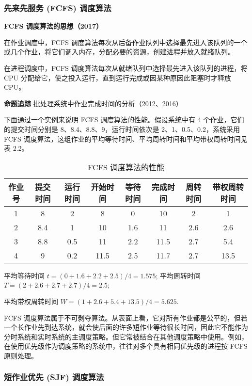 \documentclass{ctexbook}
\begin{document}
	\subsubsection{先来先服务 (FCFS) 调度算法}
	
	\textbf{FCFS 调度算法的思想（2017）}
	
	在作业调度中，FCFS 调度算法每次从后备作业队列中选择最先进入该队列的一个或几个作业，将它们调入内存，分配必要的资源，创建进程并放入就绪队列。
	
	在进程调度中，FCFS 调度算法每次从就绪队列中选择最先进入该队列的进程，将 CPU 分配给它，使之投入运行，直到运行完成或因某种原因此阻塞时才释放 CPU。
	
	\textbf{命题追踪} 批处理系统中作业完成时间的分析（2012、2016）
	
	下面通过一个实例来说明 FCFS 调度算法的性能。假设系统中有 4 个作业，它们的提交时间分别是 8、8.4、8.8、9，运行时间依次是 2、1、0.5、0.2，系统采用 FCFS 调度算法，这组作业的平均等待时间、平均周转时间和平均带权周转时间见表 2.2。
	
	\begin{table}[h]
		\centering
		\caption{FCFS 调度算法的性能}
		\label{tab:fcfs_performance}
		\begin{tabular}{|c|c|c|c|c|c|c|c|}
			\hline
			作业号 & 提交时间 & 运行时间 & 开始时间 & 等待时间 & 完成时间 & 周转时间 & 带权周转时间 \\
			\hline
			1 & 8 & 2 & 8 & 0 & 10 & 2 & 1 \\
			\hline
			2 & 8.4 & 1 & 10 & 1.6 & 11 & 2.6 & 2.6 \\
			\hline
			3 & 8.8 & 0.5 & 11 & 2.2 & 11.5 & 2.7 & 5.4 \\
			\hline
			4 & 9 & 0.2 & 11.5 & 2.5 & 11.7 & 2.7 & 13.5 \\
			\hline
			
		\end{tabular}
	\end{table}
	
	平均等待时间 $t=(0+1.6+2.2+2.5)/4=1.575$; 平均周转时间 $T=(2+2.6+2.7+2.7)/4=2.5$; 
	
	平均带权周转时间 $W=(1+2.6+5.4+13.5)/4=5.625$. 
	
	FCFS 调度算法属于不可剥夺算法。从表面上看，它对所有作业都是公平的，但若一个长作业先到达系统，就会使后面的许多短作业等待很长时间，因此它不能作为分时系统和实时系统的主调度策略。但它常被结合在其他调度策略中使用。例如，在使用优先级作为调度策略的系统中，往往对多个具有相同优先级的进程按 FCFS 原则处理。
	
	\subsubsection{短作业优先 (SJF) 调度算法}
	
\end{document}
